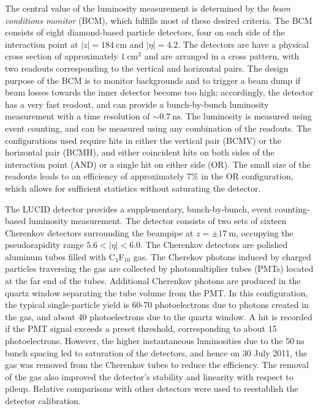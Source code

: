 The central value of the luminosity measurement is determined by the \emph{beam conditions monitor} (BCM), which fulfills most of these desired criteria. The BCM consists of eight diamond-based particle detectors, four on each side of the interaction point at $|z|=\SI{184}{\centi\meter}$ and $|\eta|=4.2$. The detectors are have a physical cross section of approximately $\SI{1}{\centi\meter\tothe{2}}$ and are arranged in a cross pattern, with two readouts corresponding to the vertical and horizontal pairs. The design purpose of the BCM is to monitor backgrounds and to trigger a beam dump if beam losses towards the inner detector become too high; accordingly, the detector has a very fast readout, and can provide a bunch-by-bunch luminosity measurement with a time resolution of $\sim \SI{0.7}{\nano\second}$. The luminosity is measured using event counting, and can be measured using any combination of the readouts. The configurations used require hits in either the vertical pair (BCMV) or the horizontal pair (BCMH), and either coincident hits on both sides of the interaction point (AND) or a single hit on either side (OR). The small size of the readouts leads to an efficiency of approximately 7\% in the OR configuration, which allows for sufficient statistics without saturating the detector. 

The LUCID detector provides a supplementary, bunch-by-bunch, event counting-based luminosity measurement. The detector consists of two sets of sixteen Cherenkov detectors surrounding the beampipe at $z=\pm\SI{17}{\meter}$, occupying the pseudorapidity range $5.6<|\eta|<6.0$. The Cherenkov detectors are polished aluminum tubes filled with C$_4$F$_{10}$ gas. The Cherekov photons induced by charged particles traversing the gas are collected by photomultiplier tubes (PMTs) located at the far end of the tubes. Additional Cherenkov photons are produced in the quartz window separating the tube volume from the PMT. In this configuration, the typical single-particle yield is 60-70 photoelectrons due to photons created in the gas, and about 40 photoelectrons due to the quartz window. A hit is recorded if the PMT signal exceeds a preset threshold, corresponding to about 15 photoelectrons. However, the higher instantaneous luminosities due to the $\SI{50}{\nano\second}$ bunch spacing led to saturation of the detectors, and hence on 30 July 2011, the gas was removed from the Cherenkov tubes to reduce the efficiency. The removal of the gas also improved the detector's stability and linearity with respect to pileup. Relative comparisons with other detectors were used to reestablish the detector calibration.

